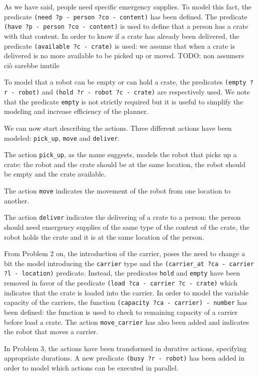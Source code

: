 As we have said, people need specific emergency supplies. To model this fact, the predicate
\texttt{(need ?p - person ?co - content)} has been defined. The predicate 
\texttt{(have ?p - person ?co - content)} is used to define that a person has a crate with that content.
In order to know if a crate has already been delivered, the predicate \texttt{(available ?c - crate)}
is used: we assume that when a crate is delivered is no more available to be picked up or moved.
TODO: non assumere ciò sarebbe inutile


To model that a robot can be empty or can hold a crate, the predicates \texttt{(empty ?r - robot)} and
\texttt{(hold ?r - robot ?c - crate)} are respectively used.
We note that the predicate \texttt{empty} is not strictly required but it is useful to simplify the modeling
and increase efficiency of the planner.




We can now start describing the actions. Three different actions have been modeled: \texttt{pick\_up}, 
\texttt{move} and \texttt{deliver}.

The action \texttt{pick\_up}, as the name suggests, models the robot that picks up a crate:
the robot and the crate should be at the same location, the robot should be empty and the crate available.

The action \texttt{move} indicates the movement of the robot from one location to another.

The action \texttt{deliver} indicates the delivering of a crate to a person: the person should need emergency
supplies of the same type of the content of the crate, the robot holds the crate and it is at the same location
of the person.


From Problem 2 on, the introduction of the carrier, poses the need to change a bit the model 
introducing the \texttt{carrier} type and the \texttt{(carrier\_at ?ca - carrier ?l - location)} predicate.
Instead, the predicates \texttt{hold} and \texttt{empty} have been removed in favor of the predicate
\texttt{(load ?ca - carrier ?c - crate)} which indicates that the crate is loaded into the carrier.
In order to model the variable capacity of the carriers, the function \texttt{(capacity ?ca - carrier) - number}
has been defined: the function is used to check to remaining capacity of a carrier before load a crate.
The action \texttt{move\_carrier} has also been added and indicates the robot that moves a carrier.

In Problem 3, the actions have been transformed in durative actions, specifying appropriate durations.
A new predicate \texttt{(busy ?r - robot)} has been added in order to model which actions can be executed 
in parallel. 